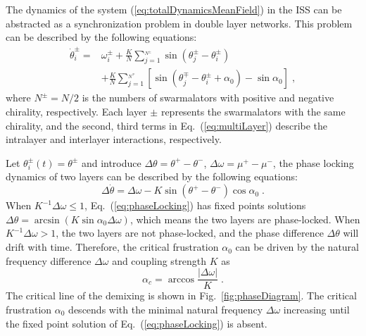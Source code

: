 \documentclass{article}
\begin{document}
The dynamics of the system (\ref{eq:totalDynamicsMeanField}) in the ISS can be abstracted as a synchronization problem in double layer networks. This problem can be described by the following equations:
\begin{equation}
    \label{eq:multiLayer}
    \begin{aligned}
        \dot{\theta}_{i}^{\pm}=&\omega _{i}^{\pm}+\frac{K}{N}\sum_{j=1}^{_{N^{\pm}}}{\sin \left( \theta _{j}^{\pm}-\theta _{i}^{\pm} \right)}\\
        &+\frac{K}{N}\sum_{j=1}^{_{N^{\mp}}}{\left[ \sin \left( \theta _{j}^{\mp}-\theta _{i}^{\pm}+\alpha _0 \right) -\sin \alpha _0 \right]}\;,
    \end{aligned}
\end{equation}
where $N^{\pm}=N/2$ is the numbers of swarmalators with positive and negative chirality, respectively. 
Each layer $\pm$ represents the swarmalators with the same chirality, and the second, third terms in Eq.~(\ref{eq:multiLayer}) describe the intralayer and interlayer interactions, respectively.


Let $\theta _{i}^{\pm}\left( t \right) =\theta ^{\pm}$ and introduce $\Delta \theta=\theta^{+}-\theta^{-}$, $\Delta \omega=\mu^{+}-\mu^{-}$, the phase locking dynamics of two layers can be described by the following equations:
\begin{equation}
    \label{eq:phaseLocking}
    \Delta \dot{\theta}=\Delta \omega -K\sin \left( \theta ^+-\theta ^- \right) \cos \alpha _0\;.
\end{equation}
When $K^{-1}\Delta \omega \leqslant 1$, Eq.~(\ref{eq:phaseLocking}) has fixed points solutions $\Delta \theta =\arcsin \left( K\sin \alpha _0\Delta \omega \right)$, which means the two layers are phase-locked. 
When $K^{-1}\Delta \omega > 1$, the two layers are not phase-locked, and the phase difference $\Delta \theta$ will drift with time. Therefore, the critical frustration $\alpha _0$ can be driven by the natural frequency difference $\Delta \omega$ and coupling strength $K$ as
\begin{equation}
    \label{eq:criticalFrustration}
    \alpha _c=\arccos \frac{\left| \Delta \omega \right|}{K}\;.
\end{equation}
The critical line of the demixing is shown in Fig.~\ref{fig:phaseDiagram}. The critical frustration $\alpha _0$ descends with the minimal natural frequency $\Delta \omega$ increasing until the fixed point solution of Eq.~(\ref{eq:phaseLocking}) is absent.
\end{document}
